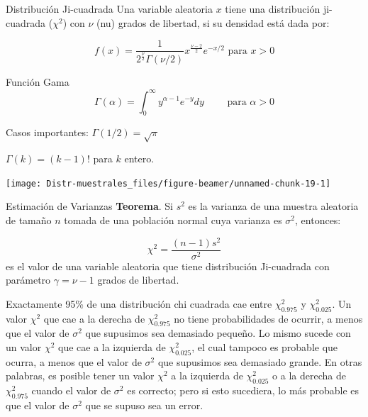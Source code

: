 \documentclass[
  10pt,
  ignorenonframetext,
]{beamer}
\begin{document}
\begin{frame}{}
\protect\hypertarget{section-51}{}
\begin{block}{Distribución Ji-cuadrada}
\protect\hypertarget{distribuciuxf3n-ji-cuadrada}{}
Una variable aleatoria \(x\) tiene una distribución ji-cuadrada
(\(\chi^2\)) con \(\nu\) (nu) grados de libertad, si su densidad está
dada por:

\[f(x)=\frac{1}{2^{\frac{\nu}{2}}\Gamma(\nu/2)}x^{\frac{\nu-2}{2}}e^{-x/2} \mbox{ para } x>0\]
\end{block}

\begin{block}{Función Gama}
\protect\hypertarget{funciuxf3n-gama}{}
\[\Gamma(\alpha)=\int_0^\infty y^{\alpha -1}e^{-y}dy \qquad \mbox{ para } \alpha >0\]

Casos importantes: \(\Gamma(1/2)=\sqrt{\pi}\)

\(\Gamma(k)= (k-1)!\) para \(k\) entero.
\end{block}
\end{frame}

\begin{frame}{}
\protect\hypertarget{section-52}{}
\begin{center}\texttt{[image: Distr-muestrales\_files/figure-beamer/unnamed-chunk-19-1]} \end{center}
\end{frame}

\begin{frame}{}
\protect\hypertarget{section-53}{}
\begin{block}{Estimación de Varianzas}
\protect\hypertarget{estimaciuxf3n-de-varianzas}{}
\textbf{Teorema}. Si \(s^2\) es la varianza de una muestra aleatoria de
tamaño \(n\) tomada de una población normal cuya varianza es
\(\sigma^2\), entonces:

\[\chi^2=\frac{(n-1)s^2}{\sigma^2}\] es el valor de una variable
aleatoria que tiene distribución Ji-cuadrada con parámetro
\(\gamma = \nu - 1\) grados de libertad.

\bigskip

Exactamente 95\% de una distribución chi cuadrada cae entre
\(\chi_{0.975}^2\) y \(\chi_{0.025}^2\). Un valor \(\chi^2\) que cae a
la derecha de \(\chi_{0.975}^2\) no tiene probabilidades de ocurrir, a
menos que el valor de \(\sigma^2\) que supusimos sea demasiado pequeño.
Lo mismo sucede con un valor \(\chi^2\) que cae a la izquierda de
\(\chi_{0.025}^2\), el cual tampoco es probable que ocurra, a menos que
el valor de \(\sigma^2\) que supusimos sea demasiado grande. En otras
palabras, es posible tener un valor \(\chi^2\) a la izquierda de
\(\chi_{0.025}^2\) o a la derecha de \(\chi_{0.975}^2\) cuando el valor
de \(\sigma^2\) es correcto; pero si esto sucediera, lo más probable es
que el valor de \(\sigma^2\) que se supuso sea un error.
\end{block}
\end{frame}
\end{document}
